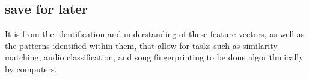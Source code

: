 \documentclass[twoside]{article}
\begin{document}
\begin{multicols}{2}


\section{save for later}
It is from the identification and understanding of these feature vectors, as well as the patterns identified within them, that allow for tasks such as similarity matching, audio classification, and song fingerprinting to be done algorithmically by computers.

{}


% 


\end{multicols}
\end{document}
